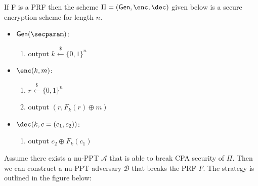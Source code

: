 \documentclass[12pt]{tufte-book}
\newcommand{\ma}{\mathcal{A}}
\newcommand{\mb}{\mathcal{B}}
\newcommand{\getsr}{\xleftarrow{\$}}
\newcommand{\gen}{\mathsf{Gen}}
\begin{document}
\begin{theorem}
    If F is a PRF then the scheme $\Pi = (\gen, \enc, \dec)$ given below is a secure encryption scheme for length $n$.

    \begin{itemize}
        \item $\gen(\secparam)$:
        \begin{enumerate}
            \item output $k \getsr \{0, 1\}^n$
        \end{enumerate}
        \item $\enc(k, m)$:
        \begin{enumerate}
            \item $r \getsr \{0, 1\}^n$
            \item output $(r, F_k(r) \oplus m)$
        \end{enumerate}
        \item $\dec(k, c=(c_1, c_2))$:
        \begin{enumerate}
            \item output $c_2 \oplus F_k(c_1)$
        \end{enumerate}
    \end{itemize}

\end{theorem}

\proof
Assume there exists a nu-PPT $\ma$ that is able to break CPA security of $\Pi$.
Then we can construct a nu-PPT adversary $\mb$ that breaks the PRF $F$.
The strategy is outlined in the figure below:
\end{document}

